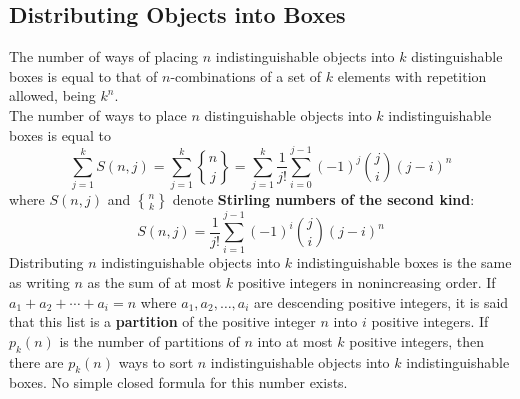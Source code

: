 \documentclass[./Discrete Math.tex]{subfiles}
\begin{document}
		\subsection{Distributing Objects into Boxes}
			The number of ways of placing \(n\) indistinguishable objects into \(k\) distinguishable boxes is equal to that of \(n\)-combinations of a set of \(k\) elements with repetition allowed, being \(k^n\). \\
			The number of ways to place \(n\) distinguishable objects into \(k\) indistinguishable boxes is equal to
				\[
					\sum_{j = 1}^k S(n, j) = \sum_{j = 1}^k {n \brace j} 
							= \sum_{j = 1}^k \frac{1}{j!}\sum_{i = 0}^{j - 1}(-1)^j\binom{j}{i}(j - i)^n
				\]
				where \(S(n, j)\) and \({n \brace k}\) denote \textbf{Stirling numbers of the second kind}:
				\[S(n, j) = \frac{1}{j!}\sum_{i = 1}^{j - 1}(-1)^i\binom{j}{i}(j - i)^n\]
			Distributing \(n\) indistinguishable objects into \(k\) indistinguishable boxes is the same as writing \(n\) as the sum of at most \(k\) positive integers in nonincreasing order. If \(a_1 + a_2 + \cdots + a_i = n\) where \(a_1, a_2, \ldots, a_i\) are descending positive integers, it is said that this list is a \textbf{partition} of the positive integer \(n\) into \(i\) positive integers. If \(p_k(n)\) is the number of partitions of \(n\) into at most \(k\) positive integers, then there are \(p_k(n)\) ways to sort \(n\) indistinguishable objects into \(k\) indistinguishable boxes. No simple closed formula for this number exists.
\end{document}
